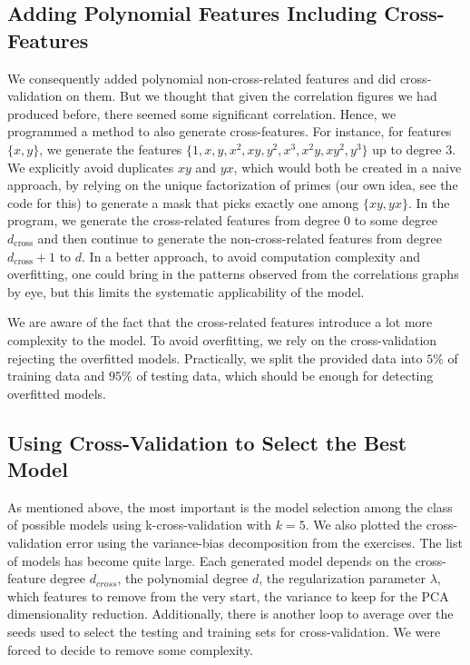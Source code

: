 \documentclass[10pt,conference,compsocconf]{IEEEtran}
\begin{document}
\subsection{Adding Polynomial Features Including Cross-Features}
We consequently added polynomial non-cross-related features and did cross-validation on them. But we thought that given the correlation figures we had produced before, there seemed some significant correlation. Hence, we programmed a method to also generate cross-features. For instance, for features $\{x, y\}$, we generate the features $\{1, x, y, x^2, xy, y^2, x^3, x^2y, xy^2, y^3\}$ up to degree $3$. We explicitly avoid duplicates $xy$ and $yx$, which would both be created in a naive approach, by relying on the unique factorization of primes (our own idea, see the code for this) to generate a mask that picks exactly one among $\{xy,yx\}$. In the program, we generate the cross-related features from degree $0$ to some degree $d_{\textrm{cross}}$ and then continue to generate the non-cross-related features from degree $d_{\textrm{cross}}+1$ to $d$. In a better approach, to avoid computation complexity and overfitting, one could bring in the patterns observed from the correlations graphs by eye, but this limits the systematic applicability of the model.

We are aware of the fact that the cross-related features introduce a lot more complexity to the model. To avoid overfitting, we rely on the cross-validation rejecting the overfitted models. Practically, we split the provided data into $5\%$ of training data and $95\%$ of testing data, which should be enough for detecting overfitted models.

\subsection{Using Cross-Validation to Select the Best Model}
As mentioned above, the most important is the model selection among the class of possible models using k-cross-validation with $k=5$. We also plotted the cross-validation error using the variance-bias decomposition from the exercises. The list of models has become quite large. Each generated model depends on the cross-feature degree $d_{cross}$, the polynomial degree $d$, the regularization parameter $\lambda$, which features to remove from the very start, the variance to keep for the PCA dimensionality reduction. Additionally, there is another loop to average over the seeds used to select the testing and training sets for cross-validation. We were forced to decide to remove some complexity. 
\end{document}
